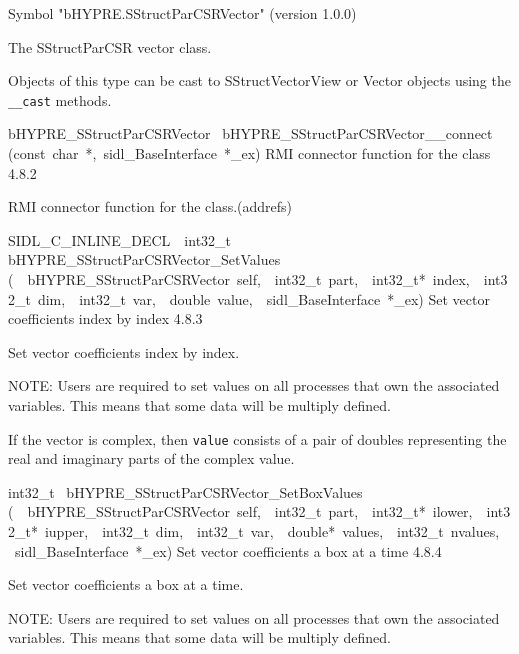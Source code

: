 \documentclass{article}
\begin{document}
\begin{cxxentry}
\begin{cxxentry}
\begin{cxxvariable}
\begin{cxxdoc}
Symbol "bHYPRE.SStructParCSRVector" (version 1.0.0)

The SStructParCSR vector class.

Objects of this type can be cast to SStructVectorView or Vector
objects using the {\tt \_\_cast} methods.
\end{cxxdoc}
\end{cxxvariable}
\begin{cxxfunction}
{bHYPRE\_SStructParCSRVector\ }
        {bHYPRE\_SStructParCSRVector\_\_connect}
        {(const\ char\ *,\ sidl\_BaseInterface\ *\_ex)}
        {
RMI connector function for the class}
        {4.8.2}
\begin{cxxdoc}

RMI connector function for the class.(addrefs)
\end{cxxdoc}
\end{cxxfunction}
\begin{cxxfunction}
{SIDL\_C\_INLINE\_DECL\ \ int32\_t\ }
        {bHYPRE\_SStructParCSRVector\_SetValues}
        {(\ \ bHYPRE\_SStructParCSRVector\ self,\ \ int32\_t\ part,\ \ int32\_t*\ index,\ \ int32\_t\ dim,\ \ int32\_t\ var,\ \ double\ value,\ \ sidl\_BaseInterface\ *\_ex)}
        {
Set vector coefficients index by index}
        {4.8.3}
\begin{cxxdoc}

Set vector coefficients index by index.

NOTE: Users are required to set values on all processes that
own the associated variables.  This means that some data will
be multiply defined.

If the vector is complex, then {\tt value} consists of a pair
of doubles representing the real and imaginary parts of the
complex value.
\end{cxxdoc}
\end{cxxfunction}
\begin{cxxfunction}
{int32\_t\ }
        {bHYPRE\_SStructParCSRVector\_SetBoxValues}
        {(\ \ bHYPRE\_SStructParCSRVector\ self,\ \ int32\_t\ part,\ \ int32\_t*\ ilower,\ \ int32\_t*\ iupper,\ \ int32\_t\ dim,\ \ int32\_t\ var,\ \ double*\ values,\ \ int32\_t\ nvalues,\ \ sidl\_BaseInterface\ *\_ex)}
        {
Set vector coefficients a box at a time}
        {4.8.4}
\begin{cxxdoc}

Set vector coefficients a box at a time.

NOTE: Users are required to set values on all processes that
own the associated variables.  This means that some data will
be multiply defined.


\end{cxxdoc}
\end{cxxfunction}
\end{cxxentry}
\end{cxxentry}
\end{document}
